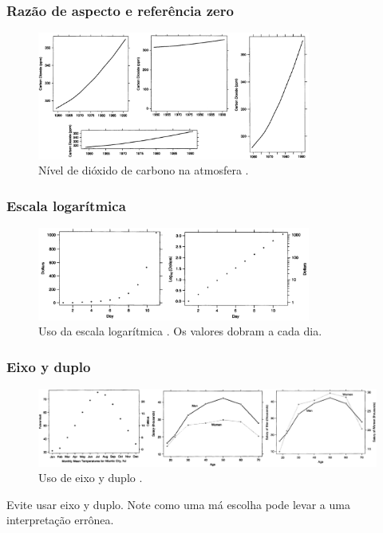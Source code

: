 \begin{frame}
\frametitle{Razão de aspecto e referência zero}
\begin{figure}[h]
 \centering
  \includegraphics[width=0.8\textwidth,height=0.7\textheight,keepaspectratio]{figures/carbondioxide.png}
 \caption{Nível de dióxido de carbono na atmosfera \cite{robbins_creating_2013}.}
 \label{fig-carbondioxide}
\end{figure}
\end{frame}


\begin{frame}
\frametitle{Escala logarítmica}
\begin{figure}[h]
 \centering
  \includegraphics[width=0.8\textwidth,height=0.7\textheight,keepaspectratio]{figures/uselogscale.png}
 \caption{Uso da escala logarítmica \cite{robbins_creating_2013}. Os valores dobram a cada dia.}
 \label{fig-uselogscale}
\end{figure}
\end{frame}


\begin{frame}
\frametitle{Eixo y duplo}
\begin{figure}[h]
 \centering
  \includegraphics[width=\textwidth,height=0.7\textheight,keepaspectratio]{figures/dyaxis.png}
 \caption{Uso de eixo y duplo \cite{robbins_creating_2013}.}
 \label{fig-dyaxis}
\end{figure}
Evite usar eixo y duplo. Note como uma má escolha pode levar a uma interpretação errônea.
\end{frame}

